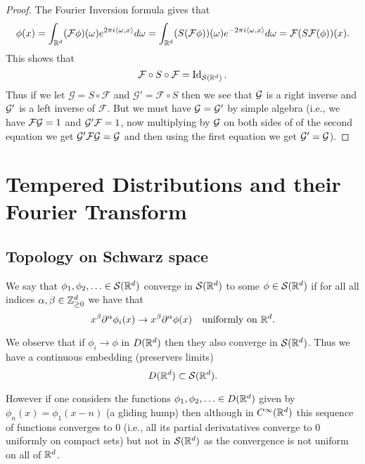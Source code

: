 \documentclass[twoside, a4paper, 10pt]{amsart}
\begin{document}
\begin{proof} The Fourier Inversion formula gives that $$\phi(x) = \int_{\mathbb{R}^d} (\mathcal{F}\phi) (\omega) e^{2\pi  i \langle \omega, x \rangle} d\omega = \int_{\mathbb{R}^d} (S(\mathcal{F}\phi))(\omega) e^{-2\pi i \langle\omega, x \rangle} d \omega = \mathcal{F}(S\mathcal{F}(\phi))(x).$$ This shows that $$\mathcal{F} \circ S \circ \mathcal{F} = \operatorname{Id}_{\mathcal{S}(\mathbb{R}^d)}.$$ Thus if we let $\mathcal{G} = S \circ \mathcal{F}$ and $\mathcal{G}' = \mathcal{F} \circ S$ then we see that $\mathcal{G}$ is a right inverse and $\mathcal{G}'$ is a left inverse of $\mathcal{F}$. But we must have $\mathcal{G} = \mathcal{G}'$ by simple algebra (i.e., we have $\mathcal{F} \mathcal{G} = 1$ and $\mathcal{G}' \mathcal{F} = 1$, now multiplying by $\mathcal{G}$ on both sides of of the second equation we get $\mathcal{G}' \mathcal{F} \mathcal{G} = \mathcal{G}$ and then using the first equation we get $\mathcal{G}' = \mathcal{G}$). \end{proof}

\section{Tempered Distributions and their Fourier Transform}

\subsection{Topology on Schwarz space}

\begin{mydef} We say that $\phi_1, \phi_2, \ldots \in \mathcal{S}(\mathbb{R}^d)$ converge in $\mathcal{S}(\mathbb{R}^d)$ to some $\phi \in \mathcal{S}(\mathbb{R}^d)$ if for all all indices $\alpha, \beta \in \mathbb{Z}_{\geq 0}^d$ we have that $$x^{\beta}\partial^{\alpha}\phi_i (x) \to x^{\beta}\partial^{\alpha}\phi (x) \quad \text{uniformly on } \mathbb{R}^d.$$

\end{mydef}

We observe that if $\phi_i \to \phi$ in $D(\mathbb{R}^d)$ then they also converge in $\mathcal{S}(\mathbb{R}^d)$.  Thus we have a continuous embedding (preservers limits) $$D(\mathbb{R}^d) \subset \mathcal{S}(\mathbb{R}^d).$$

However if one considers the functions $\phi_1, \phi_2, \ldots \in D(\mathbb{R}^d)$ given by $\phi_n (x) =\phi_1 (x-n)$ (a gliding hump) then although in $C^{\infty}(\mathbb{R}^d)$ this sequence of functions converges to $0$ (i.e., all its partial derivatatives converge to $0$ uniformly on compact sets) but not in $\mathcal{S}(\mathbb{R}^d)$ as the convergence is not uniform on all of $\mathbb{R}^d$.
\end{document}
